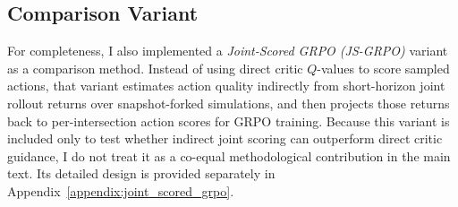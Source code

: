 \subsection{Comparison Variant}
For completeness, I also implemented a \textit{Joint-Scored GRPO (JS-GRPO)} variant as a comparison method. Instead of using direct critic $Q$-values to score sampled actions, that variant estimates action quality indirectly from short-horizon joint rollout returns over snapshot-forked simulations, and then projects those returns back to per-intersection action scores for GRPO training. Because this variant is included only to test whether indirect joint scoring can outperform direct critic guidance, I do not treat it as a co-equal methodological contribution in the main text. Its detailed design is provided separately in Appendix~\ref{appendix:joint_scored_grpo}.
